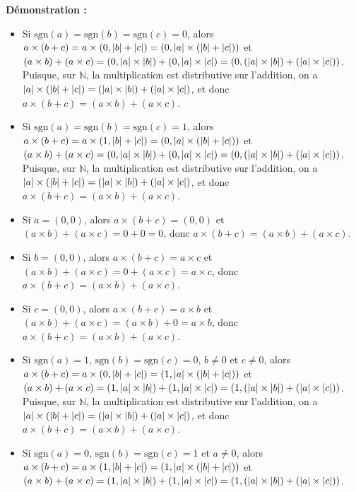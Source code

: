 \noindent\textbf{Démonstration :} 
\begin{itemize}[nosep]
    \item Si $\mathrm{sgn}(a) = \mathrm{sgn}(b) = \mathrm{sgn}(c) = 0$, alors $a \times (b + c) = a \times (0, \abs{b} + \abs{c}) = (0, \abs{a} \times (\abs{b} + \abs{c}))$ et $(a \times b) + (a \times c) = (0, \abs{a} \times \abs{b}) + (0, \abs{a} \times \abs{c}) = (0, (\abs{a} \times \abs{b}) + (\abs{a} \times \abs{c}))$.
        Puisque, sur $\mathbb{N}$, la multiplication est distributive sur l'addition, on a $\abs{a} \times (\abs{b} + \abs{c}) = (\abs{a} \times \abs{b}) + (\abs{a} \times \abs{c})$, et donc $a \times (b + c) = (a \times b) + (a \times c)$.
    \item Si $\mathrm{sgn}(a) = \mathrm{sgn}(b) = \mathrm{sgn}(c) = 1$, alors $a \times (b + c) = a \times (1, \abs{b} + \abs{c}) = (0, \abs{a} \times (\abs{b} + \abs{c}))$ et $(a \times b) + (a \times c) = (0, \abs{a} \times \abs{b}) + (0, \abs{a} \times \abs{c}) = (0, (\abs{a} \times \abs{b}) + (\abs{a} \times \abs{c}))$.
        Puisque, sur $\mathbb{N}$, la multiplication est distributive sur l'addition, on a $\abs{a} \times (\abs{b} + \abs{c}) = (\abs{a} \times \abs{b}) + (\abs{a} \times \abs{c})$, et donc $a \times (b + c) = (a \times b) + (a \times c)$.
    \item Si $a = (0,0)$, alors $a \times (b+c) = (0,0)$ et $(a \times b) + (a \times c) = 0 + 0 = 0$, donc $a \times (b + c) = (a \times b) + (a \times c)$.
    \item Si $b = (0,0)$, alors $a \times (b+c) = a \times c$ et $(a \times b) + (a \times c) = 0 + (a \times c) = a \times c$, donc $a \times (b + c) = (a \times b) + (a \times c)$.
    \item Si $c = (0,0)$, alors $a \times (b+c) = a \times b$ et $(a \times b) + (a \times c) = (a \times b) + 0 = a \times b$, donc $a \times (b + c) = (a \times b) + (a \times c)$.
    \item Si $\mathrm{sgn}(a) = 1$, $\mathrm{sgn}(b) = \mathrm{sgn}(c) = 0$, $b \neq 0$ et $c \neq 0$, alors $a \times (b + c) = a \times (0, \abs{b} + \abs{c}) = (1, \abs{a} \times (\abs{b} + \abs{c}))$ et $(a \times b) + (a \times c) = (1, \abs{a} \times \abs{b}) + (1, \abs{a} \times \abs{c}) = (1, (\abs{a} \times \abs{b}) + (\abs{a} \times \abs{c}))$.
        Puisque, sur $\mathbb{N}$, la multiplication est distributive sur l'addition, on a $\abs{a} \times (\abs{b} + \abs{c}) = (\abs{a} \times \abs{b}) + (\abs{a} \times \abs{c})$, et donc $a \times (b + c) = (a \times b) + (a \times c)$.
    \item Si $\mathrm{sgn}(a) = 0$, $\mathrm{sgn}(b) = \mathrm{sgn}(c) = 1$ et $a \neq 0$, alors $a \times (b + c) = a \times (1, \abs{b} + \abs{c}) = (1, \abs{a} \times (\abs{b} + \abs{c}))$ et $(a \times b) + (a \times c) = (1, \abs{a} \times \abs{b}) + (1, \abs{a} \times \abs{c}) = (1, (\abs{a} \times \abs{b}) + (\abs{a} \times \abs{c}))$.

\end{itemize}
